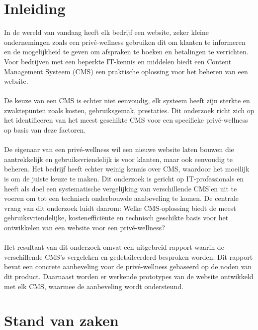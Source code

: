 
\section{Inleiding}%
\label{sec:inleiding}
\noindent
In de wereld van vandaag heeft elk bedrijf een website, zeker kleine ondernemingen zoals een privé-wellness gebruiken dit om klanten te informeren en de mogelijkheid te geven om afspraken te boeken en betalingen te verrichten. Voor bedrijven met een beperkte IT-kennis en middelen biedt een Content Management Systeem (CMS) een praktische oplossing voor het beheren van een website.
\\ \\
De keuze van een CMS is echter niet eenvoudig, elk systeem heeft zijn sterkte en zwaktepunten zoals kosten, gebruiksgemak, prestaties. Dit onderzoek richt zich op het identificeren van het meest geschikte CMS voor een specifieke privé-wellness op basis van deze factoren.
\\ \\
De eigenaar van een privé-wellness wil een nieuwe website laten bouwen die aantrekkelijk en gebruiksvriendelijk is voor klanten, maar ook eenvoudig te beheren. Het bedrijf heeft echter weinig kennis over CMS, waardoor het moeilijk is om de juiste keuze te maken. Dit onderzoek is gericht op IT-professionals en heeft als doel een systematische vergelijking van verschillende CMS’en uit te voeren om tot een technisch onderbouwde aanbeveling te komen. De centrale vraag van dit onderzoek luidt daarom: Welke CMS-oplossing biedt de meest gebruiksvriendelijke, kostenefficiënte en technisch geschikte basis voor het ontwikkelen van een website voor een privé-wellness?
\\ \\
Het resultaat van dit onderzoek omvat een uitgebreid rapport waarin de verschillende CMS's vergeleken en gedetaileerderd besproken worden. Dit rapport bevat een concrete aanbeveling voor de privé-wellness gebaseerd op de noden van dit product. Daarnaast worden er werkende prototypes van de website ontwikkeld met elk CMS, waarmee de aanbeveling wordt ondersteund.


\section{Stand van zaken}%
\label{sec:Stand van zaken}


